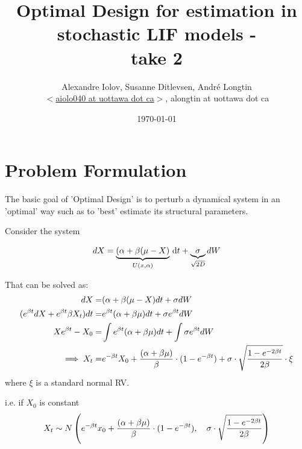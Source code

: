 \documentclass{article}
\begin{document}
\title{Optimal Design for estimation in stochastic LIF models - \\ take 2} 
\author{Alexandre Iolov, Susanne Ditlevsen, Andr\'e Longtin  \\
$<$\href{mailto:aiolo040@uottawa.ca}
		{aiolo040 at uottawa dot ca}$>$, alongtin at uottawa dot ca}

\date{\today}

\maketitle


\tableofcontents

\section{Problem Formulation}
The basic goal of 'Optimal Design' is to perturb a dynamical system in an
'optimal' way such as to 'best' estimate its structural parameters.

Consider the system 

\begin{equation}
dX = \underbrace{({\alpha} + {\beta}( \mu - X)}_{U(x,{\alpha})} \, \mathrm{d} t +
\underbrace{{\sigma }}_{\sqrt{2D}} dW
\label{eq:OU_evolution} 
\end{equation}

That can be solved as:
\begin{align*}
dX =& ({\alpha} + {\beta}( \mu - X) dt + {\sigma } dW
\\
(e^{{\beta} t} dX + e^{{\beta} t}{\beta} X_t) dt
=&
e^{ {\beta} t}( {\alpha} + {\beta} {\mu }) dt + {\sigma } e^{{\beta} t} dW
\\
Xe^{{\beta} t} - X_0 =&
\int e^{ {\beta} t}( {\alpha} + {\beta} {\mu }) dt +  \int {\sigma } e^{{\beta} t} dW
\\
\implies
X_t =& e^{-{\beta} t} X_0 
		+ \frac{({\alpha} + {\beta} {\mu })}{{\beta}} \cdot ( 1- e^{-{\beta} t}) +
	       {\sigma }  \cdot \sqrt\frac{{ 1 - e^{-2{\beta} t}}}{2{\beta}} \cdot \xi 
\end{align*}
where $\xi$ is a standard normal RV.

i.e. if $X_0$ is constant 
$$
X_t \sim N \left(e^{-{\beta} t} x_0 + \frac{({\alpha} + {\beta} {\mu })}{{\beta}} \cdot ( 1- e^{-{\beta} t}),
\quad  {\sigma }  \cdot \sqrt{ \frac{ 1 - e^{-2{\beta} t}}{2{\beta}}} \right)
$$
\end{document}
